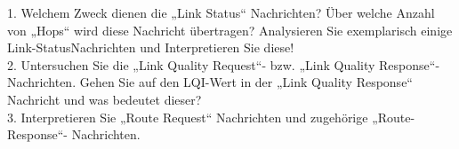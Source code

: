 1. Welchem Zweck dienen die „Link Status“ Nachrichten? Über welche Anzahl von „Hops“
wird diese Nachricht übertragen? Analysieren Sie exemplarisch einige Link-StatusNachrichten und Interpretieren Sie diese! \\


2. Untersuchen Sie die „Link Quality Request“- bzw. „Link Quality Response“-Nachrichten.
Gehen Sie auf den LQI-Wert in der „Link Quality Response“ Nachricht und was bedeutet
dieser? \\


3. Interpretieren Sie „Route Request“ Nachrichten und zugehörige „Route-Response“-
Nachrichten. 




